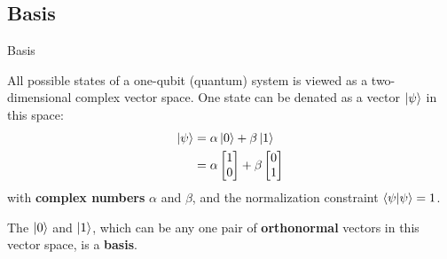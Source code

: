 \documentclass{beamer}
\begin{document}
\subsection{Basis}
\begin{frame}{Basis}
  {\tiny
    All possible states of a one-qubit (quantum) system is viewed as a two-dimensional complex vector space. One state can be denated as a vector $\ket{\psi}$ in this space:
  \begin{align*}
    \ket{\psi}&=\alpha\ket{0}+\beta\ket{1} \\
              &=\alpha\begin{bmatrix}1\\0\end{bmatrix}+\beta\begin{bmatrix}0\\1\end{bmatrix}
  \end{align*}
  with \textbf{complex numbers} $\alpha$ and $\beta$, and the normalization constraint $\braket{\psi|\psi}=1$.
  \par
  The $\ket{0}$ and $\ket{1}$, which can be any one pair of \textbf{orthonormal} vectors in this vector space, is a \textbf{basis}.
  }%
\end{frame}
\end{document}

